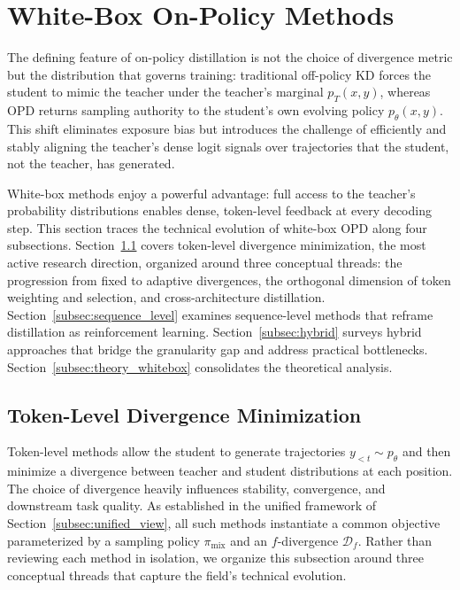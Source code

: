 \documentclass{article} %
\newcommand{\ptheta}{p_\theta}
\newcommand{\pteacher}{p_T}
\begin{document}
\section{White-Box On-Policy Methods}
\label{sec:white_box}

The defining feature of on-policy distillation is not the choice of divergence metric but the distribution that governs training: traditional off-policy KD forces the student to mimic the teacher under the teacher's marginal $\pteacher(x,y)$, whereas OPD returns sampling authority to the student's own evolving policy $\ptheta(x,y)$. This shift eliminates exposure bias but introduces the challenge of efficiently and stably aligning the teacher's dense logit signals over trajectories that the student, not the teacher, has generated.

White-box methods enjoy a powerful advantage: full access to the teacher's probability distributions enables dense, token-level feedback at every decoding step. This section traces the technical evolution of white-box OPD along four subsections. Section~\ref{subsec:token_level} covers token-level divergence minimization, the most active research direction, organized around three conceptual threads: the progression from fixed to adaptive divergences, the orthogonal dimension of token weighting and selection, and cross-architecture distillation. Section~\ref{subsec:sequence_level} examines sequence-level methods that reframe distillation as reinforcement learning. Section~\ref{subsec:hybrid} surveys hybrid approaches that bridge the granularity gap and address practical bottlenecks. Section~\ref{subsec:theory_whitebox} consolidates the theoretical analysis.

\subsection{Token-Level Divergence Minimization}
\label{subsec:token_level}

Token-level methods allow the student to generate trajectories $y_{<t} \sim \ptheta$ and then minimize a divergence between teacher and student distributions at each position. The choice of divergence heavily influences stability, convergence, and downstream task quality. As established in the unified framework of Section~\ref{subsec:unified_view}, all such methods instantiate a common objective parameterized by a sampling policy $\pi_{\mathrm{mix}}$ and an $f$-divergence $\mathcal{D}_f$. Rather than reviewing each method in isolation, we organize this subsection around three conceptual threads that capture the field's technical evolution.
\end{document}
